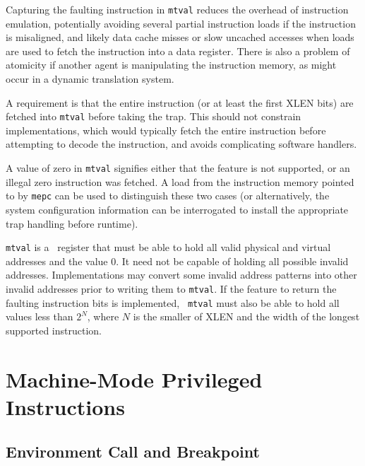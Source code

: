 \begin{commentary}
  Capturing the faulting instruction in {\tt mtval} reduces the
  overhead of instruction emulation, potentially avoiding several
  partial instruction loads if the instruction is misaligned, and
  likely data cache misses or slow uncached accesses when loads are
  used to fetch the instruction into a data register.  There is also a
  problem of atomicity if another agent is manipulating the
  instruction memory, as might occur in a dynamic translation system.

  A requirement is that the entire instruction (or at least the first
  XLEN bits) are fetched into {\tt mtval} before taking the trap.
  This should not constrain implementations, which would typically
  fetch the entire instruction before attempting to decode the
  instruction, and avoids complicating software handlers.

  A value of zero in {\tt mtval} signifies either that the feature is
  not supported, or an illegal zero instruction was fetched.  A load
  from the instruction memory pointed to by {\tt mepc} can be used to
  distinguish these two cases (or alternatively, the system
  configuration information can be interrogated to install the
  appropriate trap handling before runtime).
\end{commentary}

{\tt mtval} is a \warl\ register that must be able to hold all valid physical
and virtual addresses and the value 0.  It need not be capable of holding all
possible invalid addresses.  Implementations may convert some invalid address
patterns into other invalid addresses prior to writing them to {\tt mtval}.
If the feature to return the faulting instruction bits is implemented, {\tt
mtval} must also be able to hold all values less than $2^N$, where $N$ is the
smaller of XLEN and the width of the longest supported instruction.

\section{Machine-Mode Privileged Instructions}

\subsection{Environment Call and Breakpoint}

